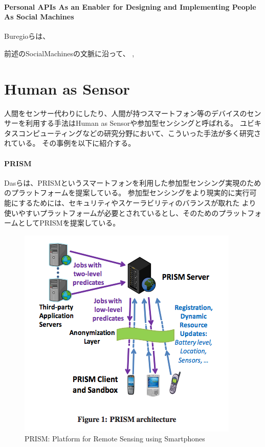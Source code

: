 \paragraph{Personal APIs As an Enabler for Designing and Implementing
People As Social
Machines}\label{personal-apis-as-an-enabler-for-designing-and-implementing-people-as-social-machines}

\mbox{}

Buregioらは、

前述のSocialMachinesの文脈に沿って、 \cite{personal-api},

\section{Human as Sensor}\label{human-as-sensor}

人間をセンサー代わりにしたり、人間が持つスマートフォン等のデバイスのセンサーを利用する手法はHuman
as Sensorや参加型センシングと呼ばれる。
ユビキタスコンピューティングなどの研究分野において、こういった手法が多く研究されている。
その事例を以下に紹介する。

\paragraph{PRISM}\label{prism}

\mbox{}

Dasらは、PRISM\cite{prism}というスマートフォンを利用した参加型センシング実現のためのプラットフォームを提案している。
参加型センシングをより現実的に実行可能にするためには、セキュリティやスケーラビリティのバランスが取れた
より使いやすいプラットフォームが必要とされているとし、そのためのプラットフォームとしてPRISMを提案している。

\begin{figure}[htbp]
  \begin{center}
  \includegraphics[width=.6\linewidth,bb=0 0 399 384]{images/prism.png}
  \end{center}
  \caption{PRISM: Platform for Remote Sensing using Smartphones}
  \label{fig:prism}
\end{figure}

